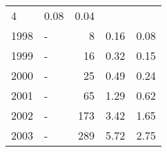 \begin{longtable}{lXrrr}
       \num{4} &
       \num[round-mode=places,round-precision=2]{0,08} &
         \num[round-mode=places,round-precision=2]{0,04} \\

     1998 &
     \multicolumn{1}{X}{ -  } &


       \num{8} &
       \num[round-mode=places,round-precision=2]{0,16} &
         \num[round-mode=places,round-precision=2]{0,08} \\

     1999 &
     \multicolumn{1}{X}{ -  } &


       \num{16} &
       \num[round-mode=places,round-precision=2]{0,32} &
         \num[round-mode=places,round-precision=2]{0,15} \\

     2000 &
     \multicolumn{1}{X}{ -  } &


       \num{25} &
       \num[round-mode=places,round-precision=2]{0,49} &
         \num[round-mode=places,round-precision=2]{0,24} \\

     2001 &
     \multicolumn{1}{X}{ -  } &


       \num{65} &
       \num[round-mode=places,round-precision=2]{1,29} &
         \num[round-mode=places,round-precision=2]{0,62} \\

     2002 &
     \multicolumn{1}{X}{ -  } &


       \num{173} &
       \num[round-mode=places,round-precision=2]{3,42} &
         \num[round-mode=places,round-precision=2]{1,65} \\

     2003 &
     \multicolumn{1}{X}{ -  } &


       \num{289} &
       \num[round-mode=places,round-precision=2]{5,72} &
         \num[round-mode=places,round-precision=2]{2,75} \\


\end{longtable}
